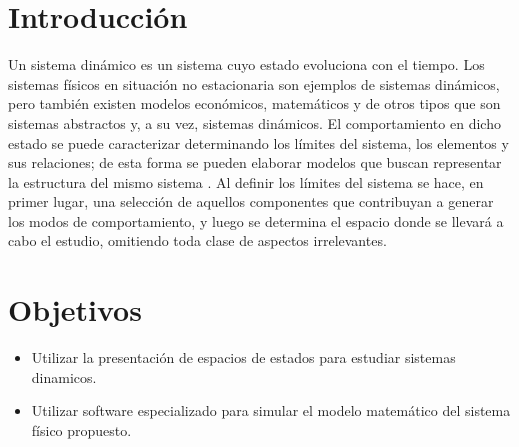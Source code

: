 \documentclass{article}
\begin{document}

\tableofcontents %

\section{Introducción}
Un sistema dinámico es un sistema cuyo estado evoluciona con el tiempo. Los sistemas físicos en situación no estacionaria son ejemplos de sistemas dinámicos, pero también existen modelos económicos, matemáticos y de otros tipos que son sistemas abstractos y, a su vez, sistemas dinámicos. El comportamiento en dicho estado se puede caracterizar determinando los límites del sistema, los elementos y sus relaciones; de esta forma se pueden elaborar modelos que buscan representar la estructura del mismo sistema \cite{albalooshi2003virtual}.
Al definir los límites del sistema se hace, en primer lugar, una selección de aquellos componentes que contribuyan a generar los modos de comportamiento, y luego se determina el espacio donde se llevará a cabo el estudio, omitiendo toda clase de aspectos irrelevantes.

\section{Objetivos}
\begin{itemize}
  \item Utilizar la presentación de espacios de estados para estudiar sistemas dinamicos.
  \item Utilizar software especializado para simular el modelo matemático del sistema físico propuesto.
\end{itemize}
\end{document}
